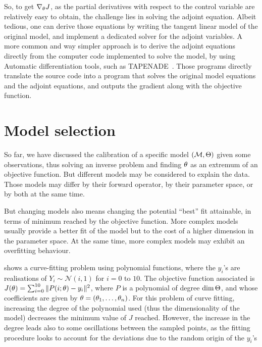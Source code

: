 \documentclass[../../Main_ManuscritThese.tex]{subfiles}
\begin{document}
So, to get $\nabla_\theta J$, as the partial derivatives with respect
to the control variable are relatively easy to obtain, the challenge
lies in solving the adjoint equation. Albeit tedious, one can derive
those equations by writing the tangent linear model of the original
model, and implement a dedicated solver for the adjoint variables. A
more common and way simpler approach is to derive the adjoint
equations directly from the computer code implemented to solve the
model, by using Automatic differentiation tools, such as
\textsc{TAPENADE}~\citep{hascoet_tapenade_2013}. Those programs
directly translate the source code into a program that solves the
original model equations and the adjoint equations, and outputs the
gradient along with the objective function.


\section{Model selection}
\label{sec:model_selection}
So far, we have discussed the calibration of a specific model
$(\mathcal{M}, \Theta)$ given some observations, thus solving an
inverse problem and finding ${\theta}_{\mathrm{}}$ as an extremum of an
objective function. But different models may be considered to explain
the data. Those models may differ by their forward operator, by their
parameter space, or by both at the same time.

But changing models also means changing the potential ``best'' fit attainable, in terms of minimum reached by the objective function.
More complex models usually provide a better fit of the model but to the cost of a higher dimension in the parameter space. At the same time, more complex models may exhibit an overfitting behaviour.

\begin{example}
   shows a curve-fitting problem using
  polynomial functions, where the $y_i$'s are realisations of
  $Y_i \sim \mathcal{N}(i, 1)$ for $i=0$ to $10$. The objective
  function associated is
  $J(\theta) = \sum_{i=0}^{10}\|P(i;\theta) - y_i\|^2$, where $P$ is a
  polynomial of degree $\dim \Theta$, and whose coefficients are
  given by $\theta = (\theta_1,\dots,\theta_n)$.  For this problem of curve
  fitting, increasing the degree of the polynomial used (thus the
  dimensionality of the model) decreases the minimum value of $J$
  reached. However, the increase in the degree leads also to some
  oscillations between the sampled points, as the fitting procedure
  looks to account for the deviations due to the random origin of the
  $y_i$'s
\end{example}
\end{document}
